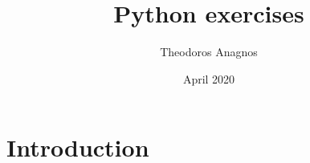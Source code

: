 \documentclass{article}
\title{Python exercises}
\author{Theodoros Anagnos}
\date{April 2020}
\begin{document}
\maketitle

\section{Introduction}
\end{document}
